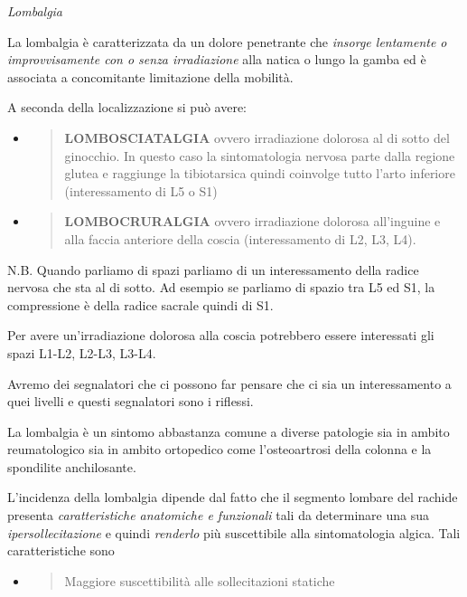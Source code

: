 \documentclass[]{article}
\date{}
\begin{document}
\emph{Lombalgia }

La lombalgia è caratterizzata da un dolore penetrante che \emph{insorge
lentamente o improvvisamente con o senza irradiazione} alla natica o
lungo la gamba ed è associata a concomitante limitazione della mobilità.

A seconda della localizzazione si può avere:

\begin{itemize}
\item
  \begin{quote}
  \textbf{LOMBOSCIATALGIA} ovvero irradiazione dolorosa al di sotto del
  ginocchio. In questo caso la sintomatologia nervosa parte dalla
  regione glutea e raggiunge la tibiotarsica quindi coinvolge tutto
  l'arto inferiore (interessamento di L5 o S1)
  \end{quote}
\end{itemize}

\begin{itemize}
\item
  \begin{quote}
  \textbf{LOMBOCRURALGIA} ovvero irradiazione dolorosa all'inguine e
  alla faccia anteriore della coscia (interessamento di L2, L3, L4).
  \end{quote}
\end{itemize}

N.B. Quando parliamo di spazi parliamo di un interessamento della radice
nervosa che sta al di sotto. Ad esempio se parliamo di spazio tra L5 ed
S1, la compressione è della radice sacrale quindi di S1.

Per avere un'irradiazione dolorosa alla coscia potrebbero essere
interessati gli spazi L1-L2, L2-L3, L3-L4.

Avremo dei segnalatori che ci possono far pensare che ci sia un
interessamento a quei livelli e questi segnalatori sono i riflessi.

La lombalgia è un sintomo abbastanza comune a diverse patologie sia in
ambito reumatologico sia in ambito ortopedico come l'osteoartrosi della
colonna e la spondilite anchilosante.

L'incidenza della lombalgia dipende dal fatto che il segmento lombare
del rachide presenta \emph{caratteristiche anatomiche e funzionali} tali
da determinare una sua \emph{ipersollecitazione} e quindi
\emph{renderlo} più suscettibile alla sintomatologia algica. Tali
caratteristiche sono

\begin{itemize}
\item
  \begin{quote}
  Maggiore suscettibilità alle sollecitazioni statiche
  \end{quote}
\end{itemize}
\end{document}
